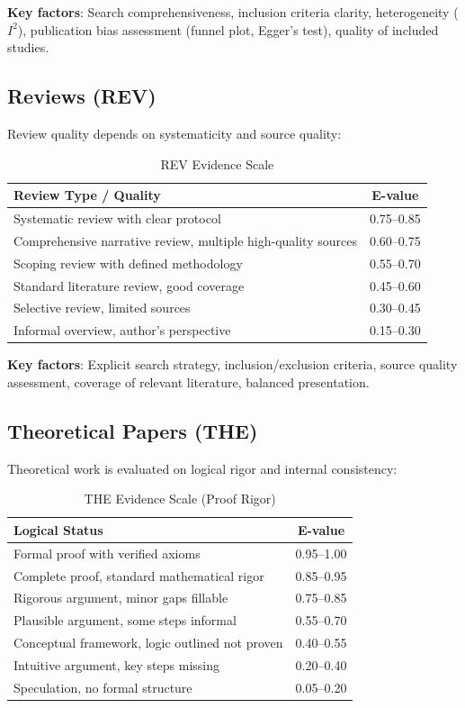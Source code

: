 \documentclass[11pt,a4paper]{article}
\begin{document}
\textbf{Key factors}: Search comprehensiveness, inclusion criteria clarity, heterogeneity ($I^2$), publication bias assessment (funnel plot, Egger's test), quality of included studies.

\subsection{Reviews (REV)}

Review quality depends on systematicity and source quality:

\begin{table}[h]
\centering
\caption{REV Evidence Scale}
\label{tab:rev-scale}
\begin{tabular}{lc}
\toprule
\textbf{Review Type / Quality} & \textbf{E-value} \\
\midrule
Systematic review with clear protocol & 0.75--0.85 \\
Comprehensive narrative review, multiple high-quality sources & 0.60--0.75 \\
Scoping review with defined methodology & 0.55--0.70 \\
Standard literature review, good coverage & 0.45--0.60 \\
Selective review, limited sources & 0.30--0.45 \\
Informal overview, author's perspective & 0.15--0.30 \\
\bottomrule
\end{tabular}
\end{table}

\textbf{Key factors}: Explicit search strategy, inclusion/exclusion criteria, source quality assessment, coverage of relevant literature, balanced presentation.

\subsection{Theoretical Papers (THE)}

Theoretical work is evaluated on logical rigor and internal consistency:

\begin{table}[h]
\centering
\caption{THE Evidence Scale (Proof Rigor)}
\label{tab:the-scale}
\begin{tabular}{lc}
\toprule
\textbf{Logical Status} & \textbf{E-value} \\
\midrule
Formal proof with verified axioms & 0.95--1.00 \\
Complete proof, standard mathematical rigor & 0.85--0.95 \\
Rigorous argument, minor gaps fillable & 0.75--0.85 \\
Plausible argument, some steps informal & 0.55--0.70 \\
Conceptual framework, logic outlined not proven & 0.40--0.55 \\
Intuitive argument, key steps missing & 0.20--0.40 \\
Speculation, no formal structure & 0.05--0.20 \\
\bottomrule
\end{tabular}
\end{table}
\end{document}
